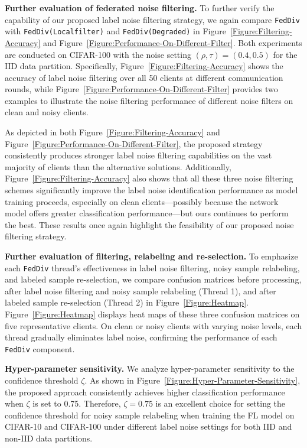 \documentclass[letterpaper]{article} %
\begin{document}
\noindent
\textbf{Further evaluation of federated noise filtering.} To further verify the capability of our proposed label noise filtering strategy, we again compare \texttt{FedDiv} with \texttt{FedDiv(Local\;filter)} and \texttt{FedDiv(Degraded)} in Figure~\textcolor{red}{\ref{Figure:Filtering-Accuracy}} and Figure~\textcolor{red}{\ref{Figure:Performance-On-Different-Filter}}. Both experiments are conducted on CIFAR-100 with the noise setting $(\rho, \tau)=(0.4, 0.5)$ for the IID data partition. Specifically, Figure~\textcolor{red}{\ref{Figure:Filtering-Accuracy}} shows the accuracy of label noise filtering over all 50 clients at different communication rounds, while Figure~\textcolor{red}{\ref{Figure:Performance-On-Different-Filter}} provides two examples to illustrate the noise filtering performance of different noise filters on clean and noisy clients.

As depicted in both Figure~\textcolor{red}{\ref{Figure:Filtering-Accuracy}} and Figure~\textcolor{red}{\ref{Figure:Performance-On-Different-Filter}}, the proposed strategy consistently produces stronger label noise filtering capabilities on the vast majority of clients than the alternative solutions. Additionally, Figure~\textcolor{red}{\ref{Figure:Filtering-Accuracy}} also shows that all these three noise filtering schemes significantly improve the label noise identification performance as model training proceeds, especially on clean clients—possibly because the network model offers greater classification performance—but ours continues to perform the best.
These results once again highlight the feasibility of our proposed noise filtering strategy.

\noindent
\textbf{Further evaluation of filtering, relabeling and re-selection.} To emphasize each \texttt{FedDiv} thread's effectiveness in label noise filtering, noisy sample relabeling, and labeled sample re-selection, we compare confusion matrices before processing, after label noise filtering and noisy sample relabeling (Thread 1), and after labeled sample re-selection (Thread 2) in Figure~\textcolor{red}{\ref{Figure:Heatmap}}. Figure~\textcolor{red}{\ref{Figure:Heatmap}} displays heat maps of these three confusion matrices on five representative clients. On clean or noisy clients with varying noise levels, each thread gradually eliminates label noise, confirming the performance of each \texttt{FedDiv} component.

\noindent
\textbf{Hyper-parameter sensitivity.}
We analyze hyper-parameter sensitivity to the confidence threshold $\zeta$. As shown in Figure~\textcolor{red}{\ref{Figure:Hyper-Parameter-Sensitivity}}, the proposed approach consistently achieves higher classification performance when $\zeta$ is set to 0.75. Therefore, $\zeta=0.75$ is an excellent choice for setting the confidence threshold for noisy sample relabeling when training the FL model on CIFAR-10 and CIFAR-100 under different label noise settings for both IID and non-IID data partitions.
\end{document}
